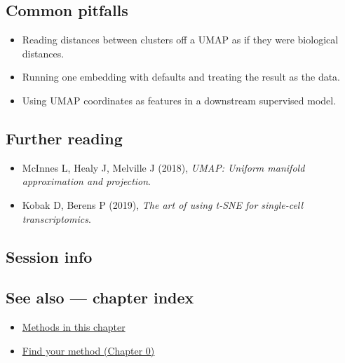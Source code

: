 \documentclass[
]{article}
\newenvironment{Shaded}{\begin{snugshade}}{\end{snugshade}}
\providecommand{\tightlist}{%
  \setlength{\itemsep}{0pt}\setlength{\parskip}{0pt}}
\begin{document}
\subsection{Common pitfalls}\label{common-pitfalls}

\begin{itemize}
\tightlist
\item
  Reading distances between clusters off a UMAP as if they were
  biological distances.
\item
  Running one embedding with defaults and treating the result as the
  data.
\item
  Using UMAP coordinates as features in a downstream supervised model.
\end{itemize}

\subsection{Further reading}\label{further-reading}

\begin{itemize}
\tightlist
\item
  McInnes L, Healy J, Melville J (2018), \emph{UMAP: Uniform manifold
  approximation and projection}.
\item
  Kobak D, Berens P (2019), \emph{The art of using t-SNE for single-cell
  transcriptomics}.
\end{itemize}

\subsection{Session info}\label{session-info}

\begin{Shaded}
\begin{Highlighting}[]

\end{Highlighting}
\end{Shaded}

\subsection{See also --- chapter index}\label{see-also-chapter-index}

\begin{itemize}
\tightlist
\item
  \href{../index.Rmd}{Methods in this chapter}
\item
  \href{../../../ch00-find-your-method.Rmd}{Find your method (Chapter
  0)}
\end{itemize}
\end{document}

